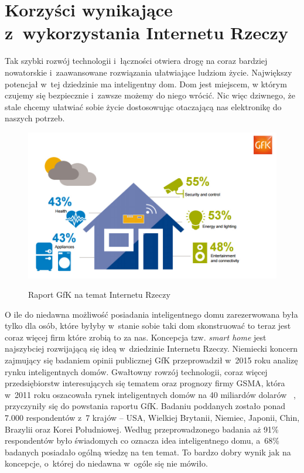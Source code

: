 \documentclass{xmgr}
\begin{document}
\section{Korzyści wynikające z~wykorzystania Internetu Rzeczy}
	Tak szybki rozwój technologii i~łączności otwiera drogę na coraz bardziej nowatorskie i~zaawansowane rozwiązania ułatwiające ludziom życie. Największy potencjał w~tej dziedzinie ma inteligentny dom. Dom jest miejscem, w którym czujemy się bezpiecznie i~zawsze możemy do niego wrócić. Nic więc dziwnego, że stale chcemy ułatwiać sobie życie dostosowując otaczającą nas elektronikę do naszych potrzeb.
\begin{figure}[h]
\centering
\includegraphics[width=\textwidth]{m_percent}
\label{fig:gfk}
\caption{Raport GfK na temat Internetu Rzeczy}
\end{figure} 
	O ile do niedawna możliwość posiadania inteligentnego domu zarezerwowana była tylko dla osób, które byłyby w~stanie sobie taki dom skonstruować to teraz jest coraz więcej firm które zrobią to za nas. Koncepcja tzw. \emph{smart home} jest najszybciej rozwijającą się ideą w~dziedzinie Internetu Rzeczy. Niemiecki koncern zajmujący się badaniem opinii publicznej GfK przeprowadził w~2015 roku analizę rynku inteligentnych domów. Gwałtowny rowzój technologii, coraz więcej przedsiębiorstw interesujących się tematem oraz prognozy firmy GSMA, która w~2011 roku oszacowała rynek inteligentnych domów na 40 miliardów dolarów~ \cite{Gsma:2011:CMC}, przyczyniły się do powstania raportu GfK. Badaniu poddanych zostało ponad 7.000 respondentów z~7 krajów – USA, Wielkiej Brytanii, Niemiec, Japonii, Chin, Brazylii oraz Korei Południowej. Według przeprowadzonego badania aż 91\% respondentów było świadomych co oznacza idea inteligentnego domu, a~68\% badanych posiadało ogólną wiedzę na ten temat. To bardzo dobry wynik jak na koncepcje, o~której do niedawna w~ogóle się nie mówiło.
\end{document}
